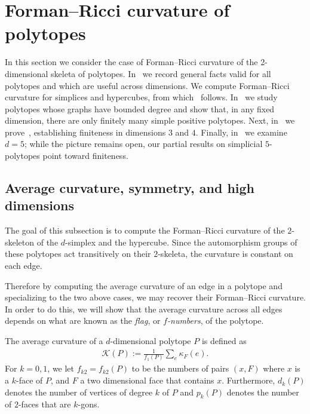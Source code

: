 \documentclass[11pt,a4paper]{amsart}
\newcommand{\forman}[1]{\kappa_F\left({#1}\right)}
\begin{document}
\section{Forman--Ricci curvature of polytopes}\label{sec: forman results}
In this section we consider the case of Forman--Ricci curvature of the 2-dimensional skeleta of polytopes. In~ we record general facts valid for all polytopes and which are useful across dimensions. We compute Forman--Ricci curvature for simplices and hypercubes, from which~ follows. In~ we study polytopes whose graphs have bounded degree and show that, in any fixed dimension, there are only finitely many simple positive polytopes. Next, in~ we prove~, establishing finiteness in dimensions $3$ and $4$. Finally, in~ we examine $d=5$; while the picture remains open, our partial results on simplicial $5$-polytopes point toward finiteness.

\subsection{Average curvature, symmetry, and high dimensions}\label{subsec:avg-curvature}
The goal of this subsection is to compute the Forman--Ricci curvature of the $2$-skeleton of the $d$-simplex and the hypercube. Since the automorphism groups of these polytopes act transitively on their $2$-skeleta, the curvature is constant on each edge.

Therefore by computing the average curvature of an edge in a polytope and specializing to the two above cases, we may recover their Forman--Ricci curvature. In order to do this, we will show that the average curvature across all edges depends on what are known as the \emph{flag}, or \emph{$f$-numbers}, of the polytope. 

The average curvature of a $d$-dimensional polytope $P$ is defined as
    \begin{align*}
        \mathcal{K}(P):= \frac{1}{f_1(P)} \sum_{e} \forman{e}.
    \end{align*}
For $k=0, 1$, we let $f_{k2}= f_{k2}(P)$ to be the numbers of pairs $(x,F)$ where $x$ is a $k$-face of $P$, and $F$ a two dimensional face that contains $x$. Furthermore, $d_k(P)$ denotes the number of vertices of degree $k$ of $P$ and $p_k(P)$ denotes the number of $2$-faces that are $k$-gons.
\end{document}

